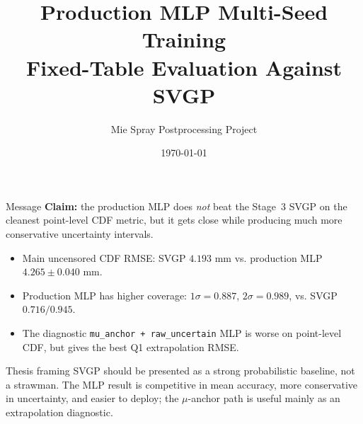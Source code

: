 \documentclass[UTF8,aspectratio=169]{ctexbeamer}
\title[Production MLP vs SVGP]{Production MLP Multi-Seed Training\\Fixed-Table Evaluation Against SVGP}
\author{Mie Spray Postprocessing Project}
\date{\today}
\begin{document}
\begin{frame}
  \titlepage
\end{frame}

\begin{frame}{Message}
\small
\textbf{Claim:} the production MLP does \emph{not} beat the Stage~3 SVGP on the cleanest
point-level CDF metric, but it gets close while producing much more conservative
uncertainty intervals.

\vspace{0.6em}
\begin{itemize}\setlength\itemsep{4pt}
  \item Main uncensored CDF RMSE: SVGP \(4.193\) mm vs. production MLP \(4.265 \pm 0.040\) mm.
  \item Production MLP has higher coverage: \(1\sigma=0.887\), \(2\sigma=0.989\), vs. SVGP \(0.716/0.945\).
  \item The diagnostic \texttt{mu\_anchor + raw\_uncertain} MLP is worse on point-level CDF,
        but gives the best Q1 extrapolation RMSE.
\end{itemize}

\vspace{0.6em}
\begin{block}{Thesis framing}
SVGP should be presented as a strong probabilistic baseline, not a strawman. The MLP result
is competitive in mean accuracy, more conservative in uncertainty, and easier to deploy;
the \(\mu\)-anchor path is useful mainly as an extrapolation diagnostic.
\end{block}
\end{frame}
\end{document}
